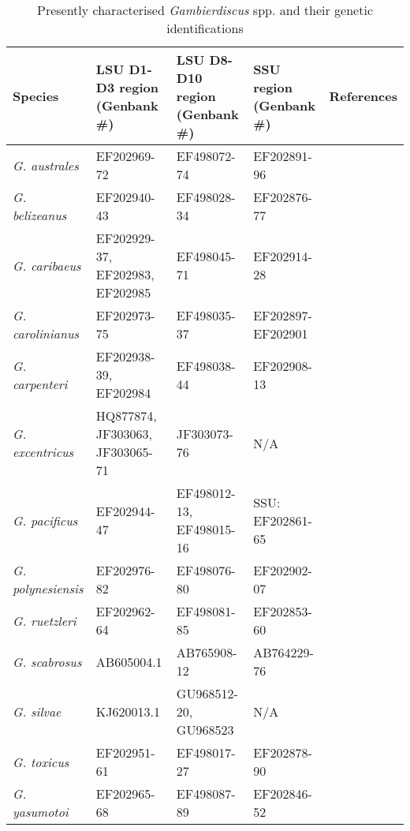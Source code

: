 \documentclass[12pt]{article}
\begin{document}
\begin{longtable}{ |  p{2.2cm} | p{2.8cm} | p{2.8cm} | p{2.8cm} | p{2.6cm} | }
\caption{Presently characterised \emph{Gambierdiscus} spp. and their genetic identifications}\\
\hline
\label{tbl:MorphTable}
\textbf{Species} & \textbf{LSU D1-D3 region (Genbank \#)} & \textbf{LSU D8-D10 region (Genbank \#)} & \textbf{SSU region (Genbank \#)} & \textbf{References} \\
\hline
 \emph{G. australes} & EF202969-72 & EF498072-74  & EF202891-96 & \cite{chinain1999morphology,litaker2009taxonomy} \\
\hline
 \emph{G. belizeanus} & EF202940-43 &  EF498028-34 & EF202876-77  & \cite{litaker2009taxonomy,faust1995observation} \\
\hline
 \emph{G. caribaeus} & EF202929-37, EF202983, EF202985 &  EF498045-71  & EF202914-28 & \cite{litaker2009taxonomy} \\
\hline
 \emph{G. carolinianus} &  EF202973-75 & EF498035-37 & EF202897-EF202901  & \cite{litaker2009taxonomy} \\
\hline
 \emph{G. carpenteri} &  EF202938-39, EF202984 & EF498038-44  & EF202908-13   & \cite{litaker2009taxonomy} \\
\hline
  \emph{G. excentricus} &  HQ877874, JF303063, JF303065-71 & JF303073-76 & N/A & \cite{litaker2009taxonomy} \\
\hline
  \emph{G. pacificus} &  EF202944-47 &  EF498012-13, EF498015-16 & SSU: EF202861-65  & \cite{litaker2009taxonomy,chinain1999morphology} \\
\hline
 \emph{G. polynesiensis} &  EF202976-82 & EF498076-80 & EF202902-07& \cite{litaker2009taxonomy,chinain1999morphology} \\
\hline 
 \emph{G. ruetzleri} &  EF202962-64 & EF498081-85 & EF202853-60 & \cite{litaker2009taxonomy} \\
 \hline
 \emph{G. scabrosus} &  AB605004.1 & AB765908-12  & AB764229-76 & \cite{nishimura2013genetic,nishimura2014morphology,kuno2010genetic} \\ 
\hline
\emph{G. silvae} &  KJ620013.1 & GU968512-20, GU968523 & N/A & \cite{litaker2010global,fraga2014genus} \\
\hline
 \emph{G. toxicus} &EF202951-61 & EF498017-27 &  EF202878-90 & \cite{litaker2009taxonomy,adachi1979thecal,chinain1997intraspecific,richlen2008phylogeography} \\
 \hline
  \emph{G. yasumotoi} & EF202965-68 & EF498087-89  &EF202846-52 & \cite{holmes1998gambierdiscus,litaker2009taxonomy} \\

\end{longtable}
\end{document}

